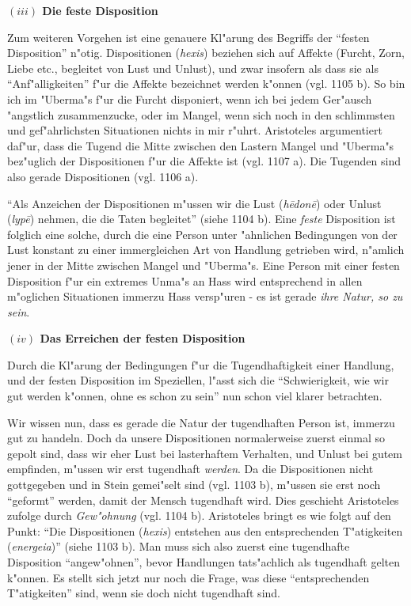 \documentclass[a4paper, emulatestandardclasses, 12pt]{scrartcl}
\begin{document}
\begin{onehalfspace}
\vspace{5mm}
\noindent\textbf{$(iii)$ Die feste Disposition}	

\noindent Zum weiteren Vorgehen ist eine genauere Kl"arung des Begriffs der "`festen Disposition"' n"otig. Dispositionen (\emph{hexis}) beziehen sich auf Affekte (Furcht, Zorn, Liebe etc., begleitet von Lust und Unlust), und zwar insofern als dass sie als "`Anf"alligkeiten"' f"ur die Affekte bezeichnet werden k"onnen (vgl. 1105 b). So bin ich im "Uberma"s f"ur die Furcht disponiert, wenn ich bei jedem Ger"ausch "angstlich zusammenzucke, oder im Mangel, wenn sich noch in den schlimmsten und gef"ahrlichsten Situationen nichts in mir r"uhrt. Aristoteles argumentiert daf"ur, dass die Tugend die Mitte zwischen den Lastern Mangel und "Uberma"s bez"uglich der Dispositionen f"ur die Affekte ist (vgl. 1107 a). Die Tugenden sind also gerade Dispositionen (vgl. 1106 a).

"`Als Anzeichen der Dispositionen m"ussen wir die Lust (\emph{h\={e}don\={e}}) oder Unlust (\emph{lyp\={e}}) nehmen, die die Taten begleitet"' (siehe 1104 b). Eine \emph{feste} Disposition ist folglich eine solche, durch die eine Person unter "ahnlichen Bedingungen von der Lust konstant zu einer immergleichen Art von Handlung getrieben wird, n"amlich jener in der Mitte zwischen Mangel und "Uberma"s. Eine Person mit einer festen Disposition f"ur ein extremes Unma"s an Hass wird entsprechend in allen m"oglichen Situationen immerzu Hass versp"uren - es ist gerade \emph{ihre Natur, so zu sein}. 

\vspace{5mm}
\noindent\textbf{$(iv)$ Das Erreichen der festen Disposition}	

\noindent Durch die Kl"arung der Bedingungen f"ur die Tugendhaftigkeit einer Handlung, und der festen Disposition im Speziellen, l"asst sich die "`Schwierigkeit, wie wir gut werden k"onnen, ohne es schon zu sein"' nun schon viel klarer betrachten. 

Wir wissen nun, dass es gerade die Natur der tugendhaften Person ist, immerzu gut zu handeln. Doch da unsere Dispositionen normalerweise zuerst einmal so gepolt sind, dass wir eher Lust bei lasterhaftem Verhalten, und Unlust bei gutem empfinden, m"ussen wir erst tugendhaft \emph{werden}. Da die Dispositionen nicht gottgegeben und in Stein gemei"selt sind (vgl. 1103 b), m"ussen sie erst noch "`geformt"' werden, damit der Mensch tugendhaft wird. Dies geschieht Aristoteles zufolge durch \emph{Gew"ohnung} (vgl. 1104 b). Aristoteles bringt es wie folgt auf den Punkt: "`Die Dispositionen (\emph{hexis}) entstehen aus den entsprechenden T"atigkeiten (\emph{energeia})"' (siehe 1103 b). Man muss sich also zuerst eine tugendhafte Disposition "`angew"ohnen"', bevor Handlungen tats"achlich als tugendhaft gelten k"onnen. Es stellt sich jetzt nur noch die Frage, was diese "`entsprechenden T"atigkeiten"' sind, wenn sie doch nicht tugendhaft sind. 


\end{onehalfspace}
\end{document}
